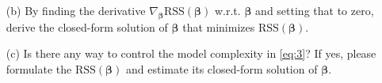 \documentclass[10pt]{article}
\begin{document}
\begin{enumerate}[1.]
\begin{itemize}
		      \item[(b)] By finding the derivative $\nabla_{\bm{\beta}}\textrm{RSS}(\bm{\beta})$ w.r.t. $\bm\beta$ and setting that to zero,
		            derive the closed-form solution of $\bm{\beta}$ that minimizes $\textrm{RSS}(\bm{\beta})$.~

		      \item[(c)] Is there any way to control the model complexity in \eqref{eq:3}? If yes,
		            please formulate the $\textrm{RSS}(\bm\beta)$ and estimate its closed-form solution of $\bm\beta$.~

	      \end{itemize}


\end{enumerate}
\end{document}
